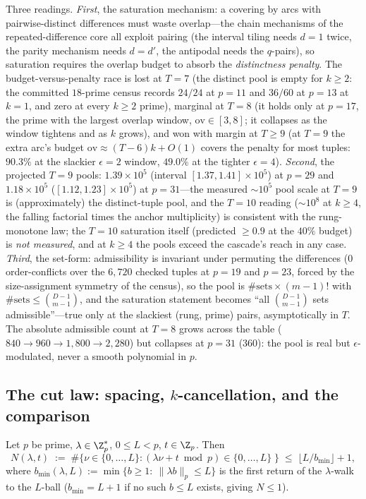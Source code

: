 Three readings. \emph{First}, the saturation mechanism: a covering by
arcs with pairwise-distinct differences must waste overlap---the chain
mechanisms of the repeated-difference core all exploit pairing (the
interval tiling needs $d=1$ twice, the parity mechanism needs
$d=d'$, the antipodal needs the $q$-pairs), so saturation requires the
overlap budget to absorb the \emph{distinctness penalty}. The
budget-versus-penalty race is lost at $T=7$ (the distinct pool is empty
for $k\ge 2$: the committed $18$-prime census records $24/24$ at $p=11$
and $36/60$ at $p=13$ at $k=1$, and zero at every $k\ge2$ prime),
marginal at $T=8$ (it holds only at $p=17$, the prime with the largest
overlap window, $\mathrm{ov}\in[3,8]$; it collapses as the window
tightens and as $k$ grows), and won with margin at $T\ge 9$ (at $T=9$
the extra arc's budget $\mathrm{ov}\approx(T-6)k+O(1)$ covers the
penalty for most tuples: $90.3\%$ at the slackier $\epsilon=2$ window,
$49.0\%$ at the tighter $\epsilon=4$). \emph{Second}, the projected
$T=9$ pools: $1.39\times10^5$ (interval $[1.37,1.41]\times10^5$) at
$p=29$ and $1.18\times10^5$ ($[1.12,1.23]\times10^5$) at $p=31$---the
measured $\sim\!10^5$ pool scale at $T=9$ is (approximately) the
distinct-tuple pool, and the $T=10$ reading ($\sim\!10^8$ at $k\ge4$,
the falling factorial times the anchor multiplicity) is consistent with
the rung-monotone law; the $T=10$ saturation itself (predicted
$\ge 0.9$ at the $40\%$ budget) is \emph{not measured}, and at
$k\ge4$ the pools exceed the cascade's reach in any case.
\emph{Third}, the set-form: admissibility is invariant under permuting
the differences ($0$ order-conflicts over the $6{,}720$ checked tuples
at $p=19$ and $p=23$, forced by the size-assignment symmetry of the
census), so the pool is $\#\text{sets}\times(m-1)!$ with
$\#\text{sets}\le\binom{D-1}{m-1}$, and the saturation statement
becomes ``all $\binom{D-1}{m-1}$ sets admissible''---true only at the
slackiest (rung, prime) pairs, asymptotically in $T$. The absolute
admissible count at $T=8$ grows across the table
($840\to960\to1{,}800\to2{,}280$) but collapses at $p=31$ ($360$): the
pool is real but $\epsilon$-modulated, never a smooth polynomial in
$p$.

\subsection{The cut law: spacing, \texorpdfstring{$k$}{k}-cancellation, and the comparison}\label{sec:scale-cut}

\begin{lemma}\label{lem:spacing}
Let $p$ be prime, $\lambda\in\Z_p^*$, $0\le L<p$, $t\in\Z_p$. Then
\[
N(\lambda,t)\;:=\;\#\{\nu\in\{0,\dots,L\}:
(\lambda\nu+t\bmod p)\in\{0,\dots,L\}\;\}
\;\le\;\lfloor L/b_{\min}\rfloor+1,
\]
where $b_{\min}(\lambda,L):=\min\{b\ge 1:\ \|\lambda b\|_p\le L\}$ is
the first return of the $\lambda$-walk to the $L$-ball ($b_{\min}=L+1$
if no such $b\le L$ exists, giving $N\le 1$).
\end{lemma}

